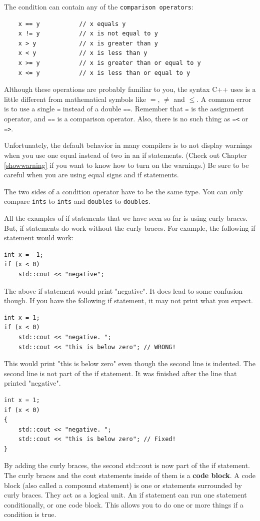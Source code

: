 
The condition can contain any of the {\tt comparison operators}:

\begin{lstlisting}
    x == y           // x equals y
    x != y           // x is not equal to y
    x > y            // x is greater than y
    x < y            // x is less than y
    x >= y           // x is greater than or equal to y
    x <= y           // x is less than or equal to y
\end{lstlisting}
%
Although these operations are probably familiar to you, the
syntax C++ uses is a little different from mathematical
symbols like $=$, $\neq$ and $\le$.  A common error is
to use a single {\tt =} instead of a double {\tt ==}.  Remember
that {\tt =} is the assignment operator, and {\tt ==} is
a comparison operator.  Also, there is no such thing as
{\tt =<} or {\tt =>}.

Unfortunately, the default behavior in many compilers is to not display warnings when you use one equal instead of two in an if statements. (Check out Chapter \ref{showwarning} if you want to know how to turn on the warnings.) Be sure to be careful when you are using equal signs and if statements.

The two sides of a condition operator have to be the same
type.  You can only compare {\tt ints} to {\tt ints} and
{\tt doubles} to {\tt doubles}. 

All the examples of if statements that we have seen so far is using curly
braces. But, if statements do work without the curly braces. For example, the
following if statement would work:
\begin{lstlisting}
int x = -1;
if (x < 0)
    std::cout << "negative";
\end{lstlisting}
The above if statement would print "negative". It does lead to some confusion though. 
If you have the following if statement, it may not print what you expect.
\begin{lstlisting}
int x = 1;
if (x < 0)
    std::cout << "negative. ";
    std::cout << "this is below zero"; // WRONG!
\end{lstlisting}
This would print "this is below zero" even though the second line is indented. 
The second line is not part of the if statement. It was finished after the
line that printed "negative".  
\begin{lstlisting}
int x = 1;
if (x < 0)
{
    std::cout << "negative. ";
    std::cout << "this is below zero"; // Fixed!
}
\end{lstlisting}
By adding the curly braces, the second std::cout is now part of the if statement.
The curly braces and the cout statements inside of them is a {\bf code block}. A code
block (also called a compound statement) is one or statements surrounded by curly braces.
They act as a logical unit. An if statement can run one statement conditionally, or
one code block. This allows you to do one or more things if a condition is true.

